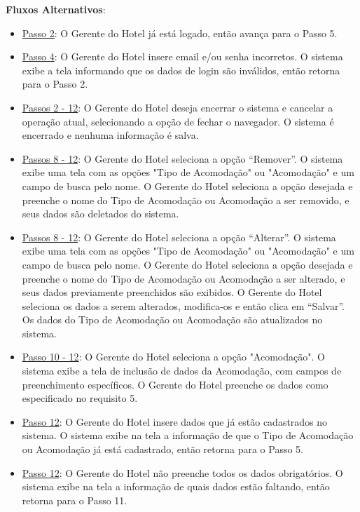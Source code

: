 \documentclass[notitlepage]{article}
\begin{document}
\textbf{Fluxos Alternativos}:\\
\begin{itemize}
\item \underline{Passo 2}: O Gerente do Hotel já está logado, então avança para o Passo 5.
\item \underline{Passo 4}: O Gerente do Hotel insere email e/ou senha incorretos. O sistema exibe a tela informando que os dados de login são inválidos, então retorna para o Passo 2.
\item \underline{Passos 2 - 12}: O Gerente do Hotel deseja encerrar o sistema e cancelar a operação atual, selecionando a opção de fechar o navegador. O sistema é encerrado e nenhuma informação é salva.  
\item \underline{Passos 8 - 12}: O Gerente do Hotel seleciona a opção “Remover”. O sistema exibe uma tela com as opções "Tipo de Acomodação" ou "Acomodação" e um campo de busca pelo nome. O Gerente do Hotel seleciona a opção desejada e preenche o nome do Tipo de Acomodação ou Acomodação a ser removido, e seus dados são deletados do sistema.    
\item \underline{Passos 8 - 12}: O Gerente do Hotel seleciona a opção “Alterar”. O sistema exibe uma tela com as opções "Tipo de Acomodação" ou "Acomodação" e um campo de busca pelo nome. O Gerente do Hotel seleciona a opção desejada e preenche o nome do Tipo de Acomodação ou Acomodação a ser alterado, e seus dados previamente preenchidos são exibidos. O Gerente do Hotel seleciona os dados a serem alterados, modifica-os e então clica em “Salvar”. Os dados do Tipo de Acomodação ou Acomodação são atualizados no sistema.
\item \underline{Passo 10 - 12}: O Gerente do Hotel seleciona a opção "Acomodação". O sistema exibe a tela de inclusão de dados da Acomodação, com campos de preenchimento específicos. O Gerente do Hotel preenche os dados como especificado no requisito 5.
\item \underline{Passo 12}: O Gerente do Hotel insere dados que já estão cadastrados no sistema. O sistema exibe na tela a informação de que o Tipo de Acomodação ou Acomodação já está cadastrado, então retorna para o Passo 5.
\item \underline{Passo 12}: O Gerente do Hotel não preenche todos os dados obrigatórios. O sistema exibe na tela a informação de quais dados estão faltando, então retorna para o Passo 11.

\end{itemize}
\end{document}
